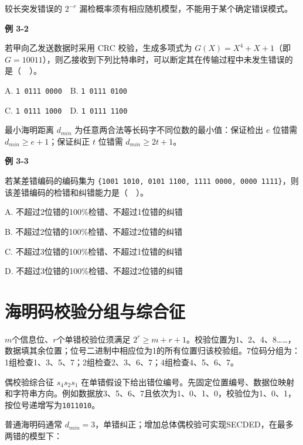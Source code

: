 较长突发错误的 \(2^{-r}\) 漏检概率须有相应随机模型，不能用于某个确定错误模式。

\par\medskip{}\noindent\hypertarget{CN03-E02}{}\label{CN03-E02}\textbf{例 3-2}\par\nobreak\smallskip

若甲向乙发送数据时采用 CRC 校验，生成多项式为 \(G(X)=X^4+X+1\)（即 \(G=10011\)），则乙接收到下列比特串时，可以断定其在传输过程中未发生错误的是（　）。

A. \texttt{1 0111 0000}　B. \texttt{1 0111 0100}

C. \texttt{1 0111 1000}　D. \texttt{1 0111 1100}

最小海明距离 \(d_{min}\) 为任意两合法等长码字不同位数的最小值：保证检出 \(e\) 位错需 \(d_{min}\ge e+1\)；保证纠正 \(t\) 位错需 \(d_{min}\ge2t+1\)。

\par\medskip{}\noindent\hypertarget{CN03-E03}{}\label{CN03-E03}\textbf{例 3-3}\par\nobreak\smallskip

若某差错编码的编码集为 \texttt{\{1001 1010,\allowbreak{} 0101 1100,\allowbreak{} 1111 0000,\allowbreak{} 0000 1111\}}，则该差错编码的检错和纠错能力是（　）。

A. 不超过2位错的100\%检错、不超过1位错的纠错

B. 不超过2位错的100\%检错、不超过2位错的纠错

C. 不超过3位错的100\%检错、不超过1位错的纠错

D. 不超过3位错的100\%检错、不超过2位错的纠错

\section{海明码校验分组与综合征}\label{CN03-hamming}

\(m\)个信息位、\(r\)个单错校验位须满足 \(2^r\ge m+r+1\)。校验位置为1、2、4、8\ldots\ldots，数据填其余位置；位号二进制中相应位为1的所有位置归该校验组。7位码分组为：1组检查1、3、5、7；2组检查2、3、6、7；4组检查4、5、6、7。

偶校验综合征 \(s_4s_2s_1\) 在单错假设下给出错位编号。先固定位置编号、数据位映射和字符串方向。例如数据放3、5、6、7且依次为1、0、1、0，校验位为1、0、1，按位号递增写为\texttt{1011010}。

普通海明码通常 \(d_{min}=3\)，单错纠正；增加总体偶校验可实现SECDED，在最多两错的模型下：


